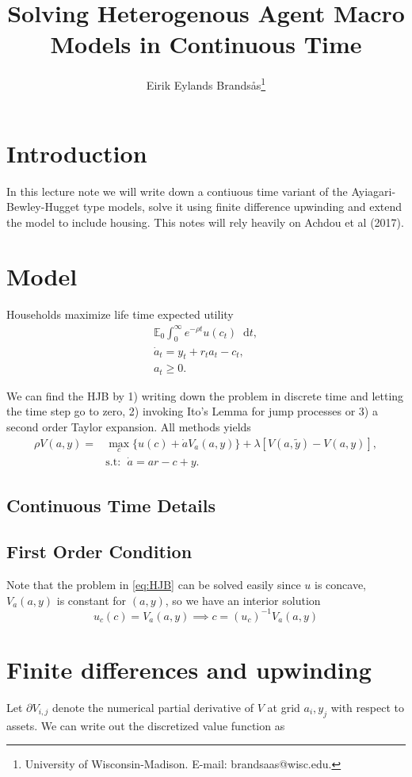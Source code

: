 \documentclass[12pt]{article}
\title{\vspace{-7ex}Solving Heterogenous Agent Macro Models in Continuous Time}
\author{Eirik Eylands Brands\aa s\thanks{University  of  Wisconsin-Madison.  E-mail: brandsaas@wisc.edu. }}
\newcommand{\E}{\mathbb{E}}
\DeclareMathOperator{\1}{\mathbbm{1}}
\newcommand*\diff{\mathop{}\!\mathrm{d}}
\begin{document}
\maketitle

\section{Introduction}
In this lecture note we will write down a contiuous time variant of the Ayiagari-Bewley-Hugget type models, solve it using finite difference upwinding and extend the model to include housing. This notes will rely heavily on Achdou et al (2017). 

\section{Model}
Households maximize life time expected utility
\begin{align}
\E_0 \int_0^\infty e^{-\rho t} u(c_t) \diff t, \\
\dot a_t = y_t + r_t a_t - c_t, \\
a_t\ge 0.
\end{align}

We can find the HJB by 1) writing down the problem in discrete time and letting the time step go to zero, 2) invoking Ito's Lemma for jump processes or 3) a second order Taylor expansion. All methods yields
\begin{align}\label{eq:HJB}
\rho V(a,y) =& \max_{c} \big\{ u(c) + \dot a V_a(a,y) \big\} + \lambda [V(a,\tilde y) - V(a,y)],\\
&\text{s.t: }\; \dot a = a r - c + y.
\end{align}


\subsection{Continuous Time Details}

\subsection{First Order Condition}
Note that the problem in \eqref{eq:HJB} can be solved easily since $u$ is concave, $V_a(a,y)$ is constant for $(a,y)$, so we have an interior solution
\begin{equation}
u_c(c)=V_a(a,y) \implies c=(u_c)^{-1} V_a(a,y)
\end{equation}

\section{Finite differences and upwinding}
 Let $\partial V_{i,j}$ denote the numerical partial derivative of $V$ at grid $a_i,y_j$ with respect to assets. We can write out the discretized value function as 
\end{document}
